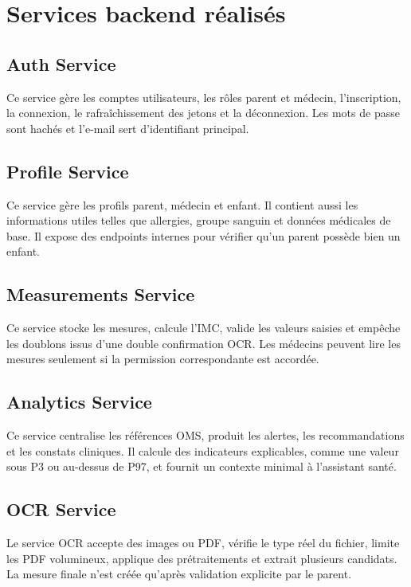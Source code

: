 \section{Services backend réalisés}
\label{sec:backend-realise}

\subsection{Auth Service}
Ce service gère les comptes utilisateurs, les rôles parent et médecin, l'inscription, la connexion, le rafraîchissement des jetons et la déconnexion. Les mots de passe sont hachés et l'e-mail sert d'identifiant principal.

\subsection{Profile Service}
Ce service gère les profils parent, médecin et enfant. Il contient aussi les informations utiles telles que allergies, groupe sanguin et données médicales de base. Il expose des endpoints internes pour vérifier qu'un parent possède bien un enfant.

\subsection{Measurements Service}
Ce service stocke les mesures, calcule l'IMC, valide les valeurs saisies et empêche les doublons issus d'une double confirmation OCR. Les médecins peuvent lire les mesures seulement si la permission correspondante est accordée.

\subsection{Analytics Service}
Ce service centralise les références OMS, produit les alertes, les recommandations et les constats cliniques. Il calcule des indicateurs explicables, comme une valeur sous P3 ou au-dessus de P97, et fournit un contexte minimal à l'assistant santé.

\subsection{OCR Service}
Le service OCR accepte des images ou PDF, vérifie le type réel du fichier, limite les PDF volumineux, applique des prétraitements et extrait plusieurs candidats. La mesure finale n'est créée qu'après validation explicite par le parent.

